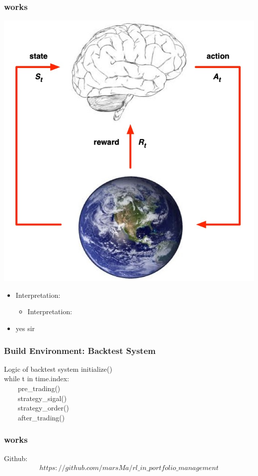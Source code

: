 \documentclass[11pt]{beamer}
\begin{document}
\begin{frame}[c]\frametitle{works}
    \includegraphics[scale=0.2]{rl_intro.jpg}
    \begin{itemize}

    \item Interpretation:
    \begin{itemize}

        \item Interpretation:
        \end{itemize}
    \item yes sir
    \end{itemize}
\end{frame}

\begin{frame}[c]\frametitle{Build Environment: Backtest System}
    \begin{block}{Logic of backtest system}
    initialize()\\
    while t in time.index:\\ \ \ \ \ pre\_trading()\\ \ \ \ \ strategy\_sigal()\\ \ \ \ \  strategy\_order()\\ \ \ \ \ after\_trading()
    \end{block}
\end{frame}

\begin{frame}[c]\frametitle{works}
Github:
\begin{align*}
    https://github.com/marsMa/rl\_in\_portfolio\_management
\end{align*}

\end{frame}
\end{document}
